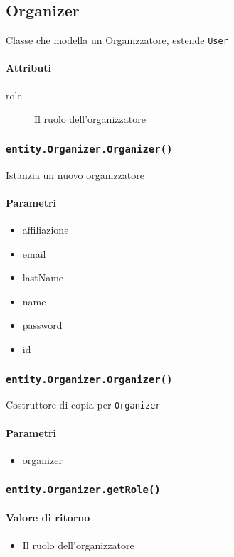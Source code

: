 \subsection{Organizer}
Classe che modella un Organizzatore, estende \texttt{User}
\paragraph{Attributi}
\begin{description}
\item[role] Il ruolo dell'organizzatore
\end{description}

\subsubsection{\texttt{entity.Organizer.Organizer()}}
Istanzia un nuovo organizzatore
\paragraph{Parametri}
\begin{itemize}
\item affiliazione
\item email
\item lastName
\item name
\item password
\item id
\end{itemize}

\subsubsection{\texttt{entity.Organizer.Organizer()}}
Costruttore di copia per \texttt{Organizer}
\paragraph{Parametri}
\begin{itemize}
\item organizer
\end{itemize}

\subsubsection{\texttt{entity.Organizer.getRole()}}
\paragraph{Valore di ritorno}
\begin{itemize}
\item Il ruolo dell'organizzatore
\end{itemize}


